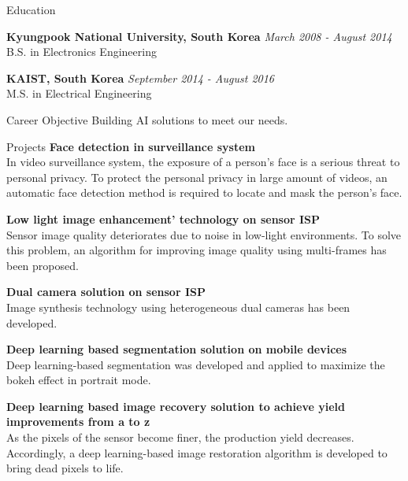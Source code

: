 \documentclass{resume}
\begin{document}
\begin{rSection}{Education}


{\bf Kyungpook National University, South Korea} \hfill {\em March 2008 - August 2014} 
\\ B.S. in Electronics Engineering\hfill 

{\bf KAIST, South Korea} \hfill {\em September 2014 - August 2016} 
\\ M.S. in Electrical Engineering\hfill

\end{rSection}

\begin{rSection}{Career Objective}
 Building AI solutions to meet our needs.
\end{rSection}

\begin{rSection}{Projects}
{\bf Face detection in surveillance system }
\\ In video surveillance system, the exposure of a person’s face is a serious threat to personal privacy.
To protect the personal privacy in large amount of videos, an automatic face detection method is required to locate and mask the person’s face.

{\bf Low light image enhancement' technology on sensor ISP}
\\ Sensor image quality deteriorates due to noise in low-light environments. To solve this problem, an algorithm for improving image quality using multi-frames has been proposed.

{\bf Dual camera solution on sensor ISP}
\\ Image synthesis technology using heterogeneous dual cameras has been developed.

{\bf Deep learning based segmentation solution on mobile devices}
\\ Deep learning-based segmentation was developed and applied to maximize the bokeh effect in portrait mode.

{\bf Deep learning based image recovery solution to achieve yield improvements from a to z}
\\ As the pixels of the sensor become finer, the production yield decreases. Accordingly, a deep learning-based image restoration algorithm is developed to bring dead pixels to life.

\end{rSection}
\end{document}
